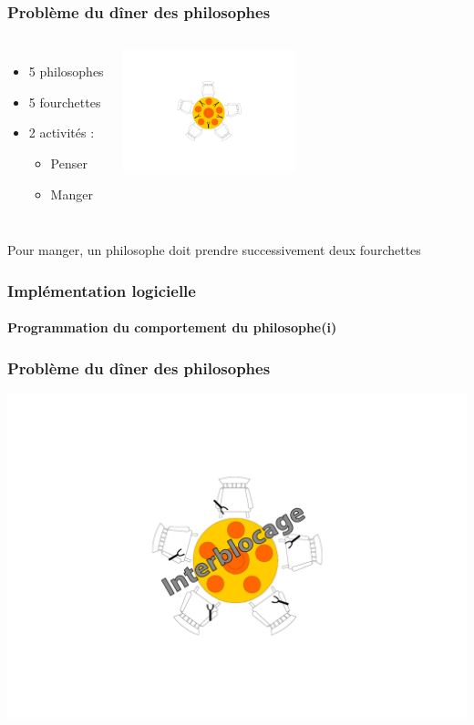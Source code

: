 \begin{frame}
\frametitle{Problème du dîner des philosophes}
\begin{columns}
\begin{itemize}
\item 5 philosophes
\item 5 fourchettes
\item 2 activités :
\begin{itemize}
\item Penser
\item Manger
\end{itemize}
\end{itemize}
\includegraphics[width=5cm]{../illustration/diner_philosophes.pdf}
\end{columns}
\begin{center}
Pour manger, un philosophe doit prendre successivement deux fourchettes
\end{center}
\end{frame}

\begin{frame}
\frametitle{Implémentation logicielle}
\framesubtitle{Programmation du comportement du philosophe(i)}
\begin{scriptsize}

\end{scriptsize}
\end{frame}

\begin{frame}
\frametitle{Problème du dîner des philosophes}
\begin{center}
\includegraphics[height=.9\textheight]{../illustration/diner_philosophes_ib.pdf}
\end{center}
\end{frame}

